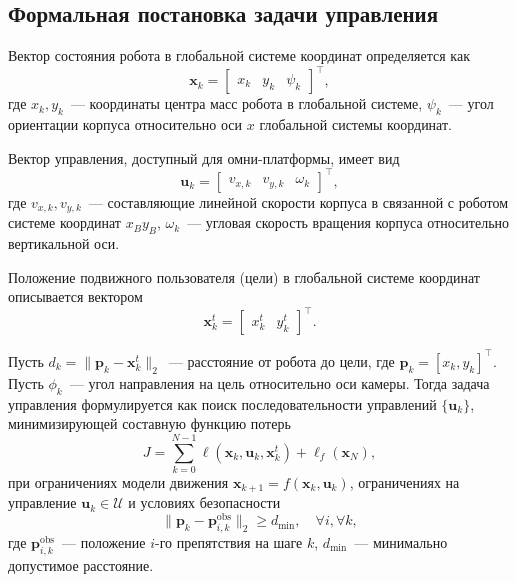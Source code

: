 \subsection{Формальная постановка задачи управления}

Вектор состояния робота в глобальной системе
координат определяется как
\begin{equation}
\mathbf{x}_k = \begin{bmatrix} x_k & y_k & \psi_k \end{bmatrix}^{\top},
\label{eq:state}
\end{equation}
где $x_k, y_k$~--- координаты центра масс робота в глобальной системе,
$\psi_k$~--- угол ориентации корпуса относительно оси $x$ глобальной
системы координат.

Вектор управления, доступный для омни-платформы, имеет вид
\begin{equation}
\mathbf{u}_k = \begin{bmatrix} v_{x,k} & v_{y,k} & \omega_k \end{bmatrix}^{\top},
\label{eq:control}
\end{equation}
где $v_{x,k}, v_{y,k}$~--- составляющие линейной скорости корпуса в связанной
с роботом системе координат $x_B y_B$, $\omega_k$~--- угловая скорость
вращения корпуса относительно вертикальной оси.

Положение подвижного пользователя (цели) в глобальной системе координат
описывается вектором
\begin{equation}
\mathbf{x}^{t}_k = \begin{bmatrix} x^{t}_k & y^{t}_k \end{bmatrix}^{\top}.
\label{eq:target_state}
\end{equation}

Пусть $d_k = \|\mathbf{p}_k - \mathbf{x}^{t}_k\|_2$~--- расстояние от робота до
цели, где $\mathbf{p}_k = [x_k, y_k]^{\top}$. Пусть $\phi_k$~--- угол
направления на цель относительно оси камеры. Тогда задача управления
формулируется как поиск последовательности управлений $\{\mathbf{u}_k\}$,
минимизирующей составную функцию потерь
\begin{equation}
J = \sum_{k=0}^{N-1} \ell(\mathbf{x}_k, \mathbf{u}_k, \mathbf{x}^{t}_k)
  + \ell_f(\mathbf{x}_N),
\label{eq:cost_general}
\end{equation}
при ограничениях модели движения $\mathbf{x}_{k+1} = f(\mathbf{x}_k,\mathbf{u}_k)$,
ограничениях на управление $\mathbf{u}_k \in \mathcal{U}$ и условиях
безопасности
\begin{equation}
\|\mathbf{p}_k - \mathbf{p}^{\text{obs}}_{i,k}\|_2 \ge d_{\min}, \quad \forall i, \forall k,
\label{eq:safety}
\end{equation}
где $\mathbf{p}^{\text{obs}}_{i,k}$~--- положение $i$-го препятствия на шаге $k$,
$d_{\min}$~--- минимально допустимое расстояние.

